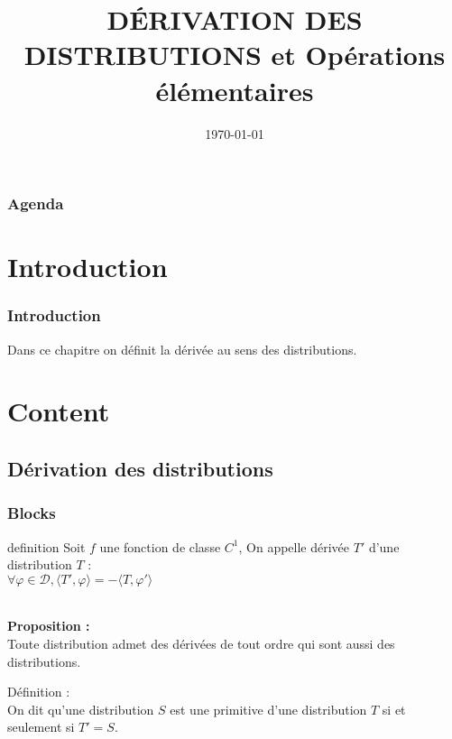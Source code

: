 \documentclass{beamer}
\title{DÉRIVATION DES DISTRIBUTIONS et Opérations élémentaires}
\author{}
\date{\today}
\begin{document}
\frame{\titlepage} %

\begin{frame}
\frametitle{Agenda}
\tableofcontents %
\end{frame}

\section{Introduction}
\begin{frame}
\frametitle{Introduction}
Dans ce chapitre on définit la dérivée au sens des distributions.
\end{frame}



\section{Content}
\subsection{Dérivation des distributions}
\begin{frame}
\frametitle{Blocks}
\begin{block}{definition}
Soit $f$ une fonction de classe $C^1$, On appelle dérivée $T'$ d'une distribution $T$ :\\
\hspace{1cm}\hspace{1cm}\hspace{1cm}\hspace{1cm} $\forall \varphi \in \mathcal{D}, \langle T', \varphi \rangle = -\langle T, \varphi' \rangle$
\end{block}
\\
\textbf{Proposition :}
\\
Toute distribution admet des dérivées de tout ordre qui sont aussi des distributions.
\\
\begin{block}{Définition :} \\
On dit qu'une distribution $S$ est une primitive d'une distribution $T$ si et seulement si $T' = S$.
\end{block}


\end{frame}
\end{document}
